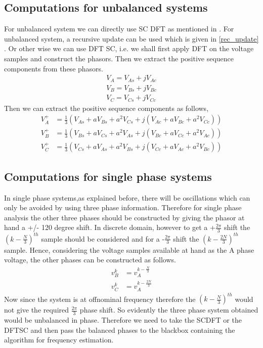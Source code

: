 \subsection{Computations for unbalanced systems}
For unbalanced system we can directly use SC DFT as mentioned in \cite{phadkethorp}. For unbalanced system, a recursive update can be used which is given in \ref{rec_update} . Or other wise we can use DFT SC, i.e. we shall first apply DFT on the voltage samples and construct the phasors. Then we extract the positive sequence components from these phasors.
\begin{align*}
V_A=V_{As}+jV_{Ac}\\
V_B=V_{Bs}+jV_{Bc}\\
V_C=V_{Cs}+jV_{Cc}
\end{align*}
Then we can extract the positive sequence components as follows,
\begin{align*}
V_A^+&=\frac{1}{3}(V_{As}+aV_{Bs}+a^2V_{Cs}+j(V_{Ac}+aV_{Bc}+a^2V_{Cc}))\\
V_B^+&=\frac{1}{3}(V_{Bs}+aV_{Cs}+a^2V_{As}+j(V_{Bc}+aV_{Cc}+a^2V_{Ac}))\\
V_C^+&=\frac{1}{3}(V_{Cs}+aV_{As}+a^2V_{Bs}+j(V_{Cc}+aV_{Ac}+a^2V_{Bc}))
\end{align*}

\subsection{Computations for single phase systems}
In single phase systems,as explained before, there will be oscillations which can only be avoided by using three phase information. Therefore for single phase analysis the other three phases should be constructed by giving the phasor at hand a +/- 120 degree shift. In discrete domain, however to get a +$\frac{2\pi}{3}$ shift the $(k-\frac{N}{3})^{th}$ sample should be considered and for a -$\frac{2\pi}{3}$ shift  the $(k-\frac{2N}{3})^{th}$ sample. Hence, considering the voltage samples available at hand as the A phase voltage, the other phases can be constructed as follows.
\begin{align*}
v_B^k&=v_A^{k-\frac{N}{3}}\\
v_C^k&=v_A^{k-\frac{2N}{3}}
\end{align*}
Now since the system is at offnominal frequency therefore the $(k-\frac{N}{3})^{th}$ would not give the required $\frac{2\pi}{3}$ phase shift. So evidently the three phase system obtained would be unbalanced in phase. Therefore we need to take the SCDFT or the DFTSC and then pass the balanced phases to the blackbox containing the algorithm for frequency estimation.

